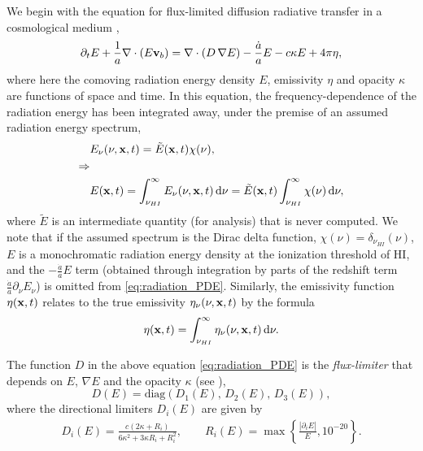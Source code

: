 \documentclass[letterpaper,10pt]{article}
\renewcommand{\(}{\left(}
\renewcommand{\)}{\right)}
\newcommand{\vb}{{\bf v}_b}
\newcommand{\xvec}{{\bf x}}
\begin{document}
We begin with the equation for flux-limited diffusion radiative
transfer in a cosmological medium \cite{ReynoldsHayesPaschosNorman2009},
\begin{equation}
\label{eq:radiation_PDE}
  \partial_{t} E + \frac1a \nabla\cdot\(E\vb\) =
    \nabla\cdot\(D\,\nabla E\) - \frac{\dot{a}}{a} E - c\kappa E + 4\pi\eta,
\end{equation}
where here the comoving radiation energy density $E$, emissivity
$\eta$ and opacity $\kappa$ are functions of space and time.  In this
equation, the frequency-dependence of the radiation energy has been
integrated away, under the premise of an assumed radiation energy
spectrum, 
\begin{align}
  \notag
  & E_{\nu}(\nu,\xvec,t) = \tilde{E}(\xvec,t) \chi(\nu), \\
  \notag
  \Rightarrow & \\
  \label{eq:spectrum}
  & E(\xvec,t) = \int_{\nu_{HI}}^{\infty} E_{\nu}(\nu,\xvec,t)\,\mathrm{d}\nu 
    = \tilde{E}(\xvec,t) \int_{\nu_{HI}}^{\infty} \chi(\nu)\,\mathrm{d}\nu,
\end{align}
where $\tilde{E}$ is an intermediate quantity (for analysis) that is
never computed.  We note that if the assumed spectrum is the Dirac
delta function, $\chi(\nu) = \delta_{\nu_{HI}}(\nu)$, $E$ is a
monochromatic radiation energy density at the ionization threshold of
HI, and the $-\frac{\dot{a}}{a}E$ term (obtained through integration
by parts of the redshift term
$\frac{\dot{a}}{a}\partial_{\nu}E_{\nu}$) is omitted from
\eqref{eq:radiation_PDE}. Similarly, the emissivity function
$\eta(\xvec,t)$ relates to the true emissivity 
$\eta_{\nu}(\nu,\xvec,t)$ by the formula
\begin{equation}
\label{eq:emissivity}
  \eta(\xvec,t) = \int_{\nu_{HI}}^{\infty}\eta_{\nu}(\nu,\xvec,t)\,\mathrm{d}\nu.
\end{equation}

The function $D$ in the above equation \eqref{eq:radiation_PDE} is
the {\em flux-limiter} that depends on $E$, $\nabla E$ and the 
opacity $\kappa$ (see
\cite{HayesNorman2003,ReynoldsHayesPaschosNorman2009}),  
\[
   D(E) = \text{diag}\( D_1(E),\, D_2(E),\, D_3(E) \),
\]
where the directional limiters $D_i(E)$ are given by
\begin{align}
  \label{eq:Zeus_limiter}
   D_i(E) = \frac{c(2\kappa+R_i)}{6\kappa^2+3\kappa R_i+R_i^2}, \qquad
   R_i(E) = \max\left\{\frac{|\partial_i E|}{E}, 10^{-20} \right\}.
\end{align}
\end{document}
